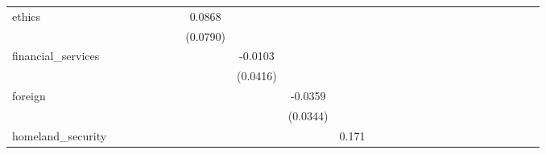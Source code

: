 \begin{tabular}{l*{25}{c}}
ethics              &            &            &            &            &            &            &      0.0868&            &            &            &            &            &            &            &            &            &            &            &            &            &            &            &            &            &            \\
                    &            &            &            &            &            &            &    (0.0790)&            &            &            &            &            &            &            &            &            &            &            &            &            &            &            &            &            &            \\
financial\_services  &            &            &            &            &            &            &            &     -0.0103&            &            &            &            &            &            &            &            &            &            &            &            &            &            &            &            &            \\
                    &            &            &            &            &            &            &            &    (0.0416)&            &            &            &            &            &            &            &            &            &            &            &            &            &            &            &            &            \\
foreign             &            &            &            &            &            &            &            &            &     -0.0359&            &            &            &            &            &            &            &            &            &            &            &            &            &            &            &            \\
                    &            &            &            &            &            &            &            &            &    (0.0344)&            &            &            &            &            &            &            &            &            &            &            &            &            &            &            &            \\
homeland\_security   &            &            &            &            &            &            &            &            &            &       0.171&            &            &            &            &            &            &            &            &            &            &            &            &            &            &            \\

\end{tabular}
